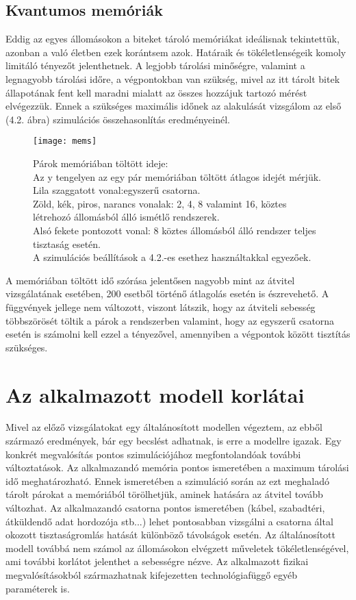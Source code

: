 \subsection{Kvantumos memóriák}
Eddig az egyes állomásokon a biteket tároló memóriákat ideálisnak tekintettük, azonban a való életben ezek korántsem azok. Határaik és tökéletlenségeik komoly limitáló tényezőt jelenthetnek. A legjobb tárolási minőségre, valamint a legnagyobb tárolási időre, a végpontokban van szükség, mivel az itt tárolt bitek állapotának fent kell maradni mialatt az összes hozzájuk tartozó mérést elvégezzük. Ennek a szükséges maximális időnek az alakulását vizsgálom az első (4.2. ábra) szimulációs összehasonlítás eredményeinél.
\begin{figure}[H]
\centering
\texttt{[image: mems]}
\caption[Párok memóriában töltött ideje]
{Párok memóriában töltött ideje:\\
Az y tengelyen az egy pár memóriában töltött átlagos idejét mérjük.\\
Lila szaggatott vonal:egyszerű csatorna.\\
Zöld, kék, piros, narancs vonalak: 2, 4, 8 valamint 16, köztes létrehozó állomásból álló ismétlő rendszerek.\\
Alsó fekete pontozott vonal: 8 köztes állomásból álló rendszer teljes tisztaság esetén.\\
A szimulációs beállítások a 4.2.-es esethez használtakkal egyezőek.
}
\end{figure}
A memóriában töltött idő szórása jelentősen nagyobb mint az átvitel vizsgálatának esetében, 200 esetből történő átlagolás esetén is észrevehető. A függvények jellege nem változott, viszont látszik, hogy az átviteli sebesség többszörösét töltik a párok a rendszerben valamint, hogy az egyszerű csatorna esetén is számolni kell ezzel a tényezővel, amennyiben a végpontok között tisztítás szükséges.


\section{Az alkalmazott modell korlátai}
Mivel az előző vizsgálatokat egy általánosított modellen végeztem, az ebből származó eredmények, bár egy becslést adhatnak,  is erre a modellre igazak. Egy konkrét megvalósítás pontos szimulációjához megfontolandóak további változtatások. Az alkalmazandó memória pontos ismeretében a maximum tárolási idő meghatározható. Ennek ismeretében a szimuláció során az ezt meghaladó tárolt párokat a memóriából törölhetjük, aminek hatására az átvitel tovább változhat. Az alkalmazandó csatorna pontos ismeretében (kábel, szabadtéri, átküldendő adat hordozója stb...) lehet pontosabban vizsgálni a csatorna által okozott tisztaságromlás hatását különböző távolságok esetén. Az általánosított modell továbbá nem számol az állomásokon elvégzett műveletek tökéletlenségével, ami további korlátot jelenthet a sebességre nézve. Az alkalmazott fizikai megvalósításokból származhatnak kifejezetten technológiafüggő egyéb paraméterek is. 

